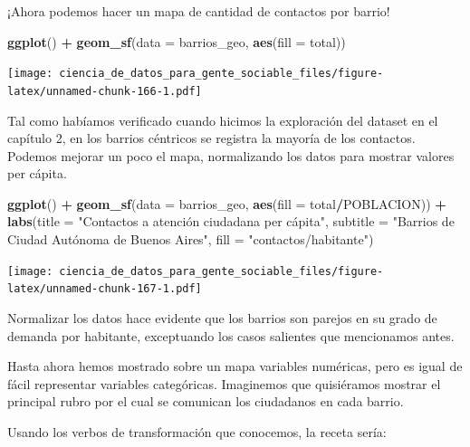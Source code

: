 \documentclass[spanish,]{book}
\newenvironment{Shaded}{\begin{snugshade}}{\end{snugshade}}
\newcommand{\DataTypeTok}[1]{\textcolor[rgb]{0.13,0.29,0.53}{#1}}
\newcommand{\KeywordTok}[1]{\textcolor[rgb]{0.13,0.29,0.53}{\textbf{#1}}}
\newcommand{\NormalTok}[1]{#1}
\newcommand{\OperatorTok}[1]{\textcolor[rgb]{0.81,0.36,0.00}{\textbf{#1}}}
\newcommand{\StringTok}[1]{\textcolor[rgb]{0.31,0.60,0.02}{#1}}
\begin{document}
¡Ahora podemos hacer un mapa de cantidad de contactos por barrio!

\begin{Shaded}
\begin{Highlighting}[]
\KeywordTok{ggplot}\NormalTok{() }\OperatorTok{+}\StringTok{ }\KeywordTok{geom_sf}\NormalTok{(}\DataTypeTok{data =}\NormalTok{ barrios_geo, }\KeywordTok{aes}\NormalTok{(}\DataTypeTok{fill =}\NormalTok{ total))}
\end{Highlighting}
\end{Shaded}

\texttt{[image: ciencia\_de\_datos\_para\_gente\_sociable\_files/figure-latex/unnamed-chunk-166-1.pdf]}

Tal como habíamos verificado cuando hicimos la exploración del dataset en el capítulo 2, en los barrios céntricos se registra la mayoría de los contactos. Podemos mejorar un poco el mapa, normalizando los datos para mostrar valores per cápita.

\begin{Shaded}
\begin{Highlighting}[]
\KeywordTok{ggplot}\NormalTok{() }\OperatorTok{+}\StringTok{ }
\StringTok{    }\KeywordTok{geom_sf}\NormalTok{(}\DataTypeTok{data =}\NormalTok{ barrios_geo, }\KeywordTok{aes}\NormalTok{(}\DataTypeTok{fill =}\NormalTok{ total}\OperatorTok{/}\NormalTok{POBLACION)) }\OperatorTok{+}
\StringTok{    }\KeywordTok{labs}\NormalTok{(}\DataTypeTok{title =} \StringTok{"Contactos a atención ciudadana per cápita"}\NormalTok{,}
         \DataTypeTok{subtitle =} \StringTok{"Barrios de Ciudad Autónoma de Buenos Aires"}\NormalTok{,}
         \DataTypeTok{fill =} \StringTok{"contactos/habitante"}\NormalTok{)}
\end{Highlighting}
\end{Shaded}

\texttt{[image: ciencia\_de\_datos\_para\_gente\_sociable\_files/figure-latex/unnamed-chunk-167-1.pdf]}

Normalizar los datos hace evidente que los barrios son parejos en su grado de demanda por habitante, exceptuando los casos salientes que mencionamos antes.

Hasta ahora hemos mostrado sobre un mapa variables numéricas, pero es igual de fácil representar variables categóricas. Imaginemos que quisiéramos mostrar el principal rubro por el cual se comunican los ciudadanos en cada barrio.

Usando los verbos de transformación que conocemos, la receta sería:
\end{document}
